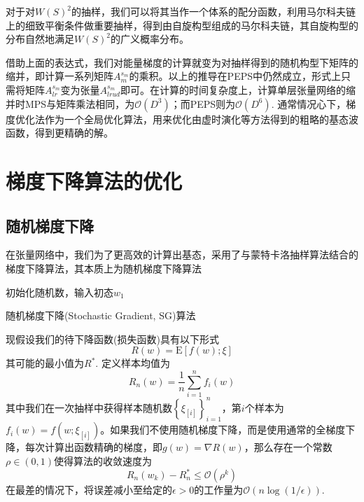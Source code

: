 对于对$W(S)^2$的抽样，我们可以将其当作一个体系的配分函数，利用马尔科夫链上的细致平衡条件做重要抽样，得到由自旋构型组成的马尔科夫链，其自旋构型的分布自然地满足$W(S)^2$的广义概率分布。

借助上面的表达式，我们对能量梯度的计算就变为对抽样得到的随机构型下矩阵的缩并，即计算一系列矩阵$A_m^{s_m}$的乘积。以上的推导在PEPS中仍然成立，形式上只需将矩阵$A^{s_m}_{lr}$变为张量$A^{s_m}_{lrud}$即可。在计算的时间复杂度上，计算单层张量网络的缩并时MPS与矩阵乘法相同，为$\mathcal{O}(D^3)$；而PEPS则为$\mathcal{O}(D^6)$. 通常情况心下，梯度优化法作为一个全局优化算法，用来优化由虚时演化等方法得到的粗略的基态波函数，得到更精确的解。

\section{梯度下降算法的优化}

\subsection{随机梯度下降}

在张量网络中，我们为了更高效的计算出基态，采用了与蒙特卡洛抽样算法结合的梯度下降算法，其本质上为随机梯度下降算法\cite[22]{bottouOptimizationMethodsLargeScale2018}
\begin{algorithm}[htb]
	
	
	初始化随机数，输入初态$w_1$\;
	\caption{随机梯度下降(Stochastic Gradient, SG)算法}
	\label{algo:algorithm1}
\end{algorithm}

现假设我们的待下降函数(损失函数)具有以下形式
\begin{equation}\label{eq-sum-form}
R(w)=\mathrm{E}[f(w);\xi]
\end{equation}
其可能的最小值为$R^*$. 
定义样本均值为
\begin{equation}\label{key}
R_n(w)=\frac1n \sum_{i=1}^n f_i(w)
\end{equation}
其中我们在一次抽样中获得样本随机数$\left\{\xi_{[i]}\right\}_{i=1}^n$，第$i$个样本为$f_i(w)=f(w;\xi_{[i]})$。如果我们不使用随机梯度下降，而是使用通常的全梯度下降，每次计算出函数精确的梯度，即$g(w)=\nabla R(w)$，那么存在一个常数$\rho\in(0,1)$使得算法的收敛速度为
\begin{equation}\label{key}
R_n(w_k)-R_n^* \leq \mathcal{O}(\rho^k)
\end{equation}
在最差的情况下，将误差减小至给定的$\epsilon> 0$的工作量为$\mathcal{O}(n\log(1/\epsilon))$.

